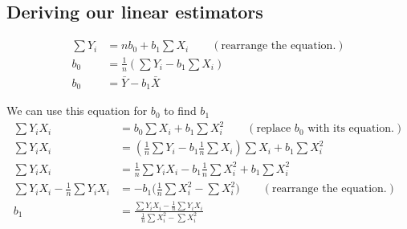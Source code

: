 \documentclass{article}
\begin{document}
   \subsection{Deriving our linear estimators}
	\begin{align*}
		\sum Y_i &= nb_0 + b_1 \sum X_i \quad \quad (\text{rearrange the
		equation.}) \\
			b_0 &= \frac{1}{n}(\sum Y_i -b_1\sum X_i) \\ 
			b_0 &= \bar{Y} - b_1\bar{X}
	\end{align*}

	We can use this equation for $b_0$ to find $b_1$
	\begin{align*}
		\sum Y_iX_i &= b_0\sum X_i + b_1 \sum X_i^2 \quad \quad (\text{
			replace $b_0$ with its equation.}) \\
		\sum Y_iX_i &= (\frac{1}{n}\sum Y_i - b_1\frac{1}{n}\sum X_i)
		\sum X_i + b_1 \sum X_i^2 \\ 
		\sum Y_iX_i &= \frac{1}{n}\sum Y_iX_i - b_1\frac{1}{n}\sum X_i^2
		 + b_1 \sum X_i^2 \\ 
		\sum Y_iX_i - \frac{1}{n}\sum Y_iX_i &= - b_1\bigg(\frac{1}{n}
		\sum X_i^2 - \sum X_i^2\bigg) \quad \quad (\text{
			rearrange the equation.}) \\
		b_1 &=\frac{\sum Y_iX_i - \frac{1}{n}\sum Y_iX_i}{\frac{1}{n} 
		\sum X_i^2 - \sum X_i^2}
	\end{align*}






		
\end{document}
